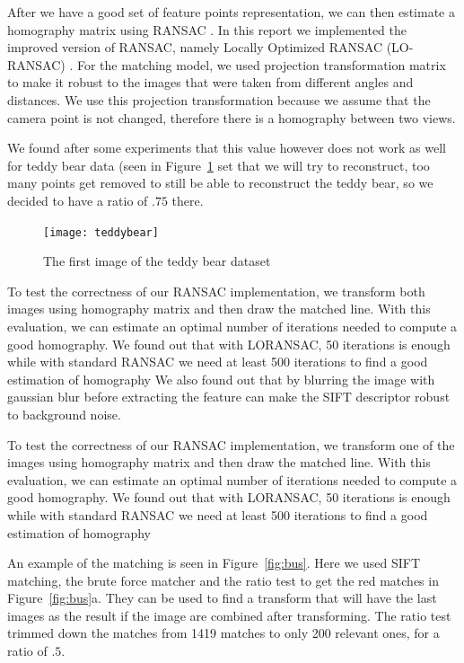 After we have a good set of feature points representation, we can then estimate a homography matrix using RANSAC \cite{RANSAC}. 
In this report we implemented the improved version of RANSAC, namely Locally Optimized RANSAC (LO-RANSAC) \cite{LORANSAC}.
For the matching model, we used projection transformation matrix to make it robust to the images that were taken from different angles and distances.
We use this projection transformation because we assume that the camera point is not changed, therefore there is a homography between two views.

We found after some experiments that this value however does not work as well for teddy bear data (seen in Figure~\ref{fig:bear} set that we will try to reconstruct,
too many points get removed to still be able to reconstruct the teddy bear,
so we decided to have a ratio of $.75$ there.

\begin{figure}[ht]
	\centering
	\texttt{[image: teddybear]}
	\caption{The first image of the teddy bear dataset}
	\label{fig:bear}
\end{figure}

To test the correctness of our RANSAC implementation, we transform both images using homography matrix and then draw the matched line.
With this evaluation, we can estimate an optimal number of iterations needed to compute a good homography.
We found out that with LORANSAC, 50 iterations is enough while with standard RANSAC we need at least 500 iterations to find a good estimation of homography
We also found out that by blurring the image with gaussian blur before extracting the feature can make the SIFT descriptor robust to background noise.


To test the correctness of our RANSAC implementation, we transform one of the images using homography matrix and then draw the matched line.
With this evaluation, we can estimate an optimal number of iterations needed to compute a good homography.
We found out that with LORANSAC, 50 iterations is enough while with standard RANSAC we need at least 500 iterations to find a good estimation of homography 

An example of the matching is seen in Figure~\ref{fig:bus}. 
Here we used SIFT matching, the brute force matcher and the ratio test to get the red matches in Figure~\ref{fig:bus}a. 
They can be used to find a transform that will have the last images as the result if the image are combined after transforming.
The ratio test trimmed down the matches from 1419 matches to only 200 relevant ones, for a ratio of $.5$.